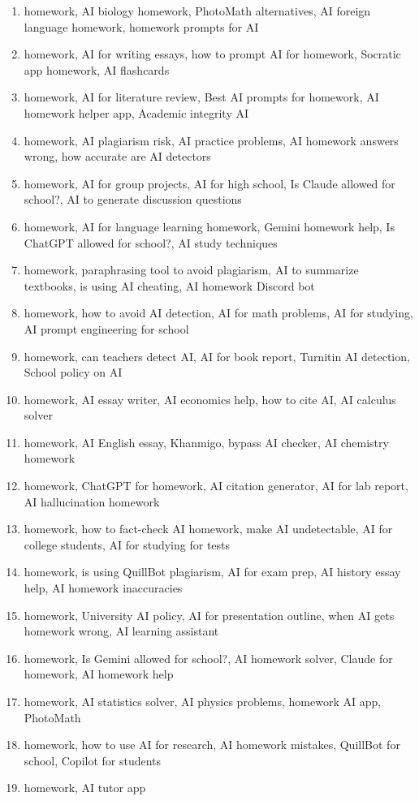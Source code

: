 \documentclass[11pt]{article}
\begin{document}
\begin{enumerate}
\item homework, AI biology homework, PhotoMath alternatives, AI foreign language homework, homework prompts for AI
\item homework, AI for writing essays, how to prompt AI for homework, Socratic app homework, AI flashcards
\item homework, AI for literature review, Best AI prompts for homework, AI homework helper app, Academic integrity AI
\item homework, AI plagiarism risk, AI practice problems, AI homework answers wrong, how accurate are AI detectors
\item homework, AI for group projects, AI for high school, Is Claude allowed for school?, AI to generate discussion questions
\item homework, AI for language learning homework, Gemini homework help, Is ChatGPT allowed for school?, AI study techniques
\item homework, paraphrasing tool to avoid plagiarism, AI to summarize textbooks, is using AI cheating, AI homework Discord bot
\item homework, how to avoid AI detection, AI for math problems, AI for studying, AI prompt engineering for school
\item homework, can teachers detect AI, AI for book report, Turnitin AI detection, School policy on AI
\item homework, AI essay writer, AI economics help, how to cite AI, AI calculus solver
\item homework, AI English essay, Khanmigo, bypass AI checker, AI chemistry homework
\item homework, ChatGPT for homework, AI citation generator, AI for lab report, AI hallucination homework
\item homework, how to fact-check AI homework, make AI undetectable, AI for college students, AI for studying for tests
\item homework, is using QuillBot plagiarism, AI for exam prep, AI history essay help, AI homework inaccuracies
\item homework, University AI policy, AI for presentation outline, when AI gets homework wrong, AI learning assistant
\item homework, Is Gemini allowed for school?, AI homework solver, Claude for homework, AI homework help
\item homework, AI statistics solver, AI physics problems, homework AI app, PhotoMath
\item homework, how to use AI for research, AI homework mistakes, QuillBot for school, Copilot for students
\item homework, AI tutor app
\end{enumerate}
\end{document}
